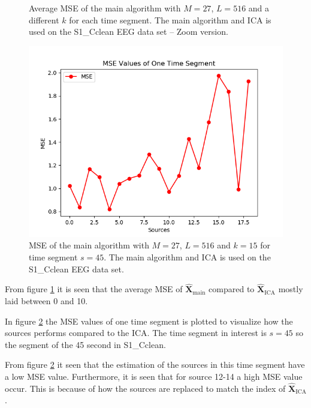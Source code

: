 \begin{figure}[H]
\begin{minipage}[t]{.45\textwidth}
	\caption{Average MSE of the main algorithm with $M=27$, $L = 516$ and a different $k$ for each time segment. The main algorithm and ICA is used on the S1\_Cclean EEG data set -- Zoom version.}
	\label{fig:M=N_1_2}
    \end{minipage}
\end{figure}
\noindent 
 
\begin{figure}[H]
\centering
\includegraphics[scale=0.5]{figures/ch_7/MSE_M=N.png}
\caption{MSE of the main algorithm with $M=27$, $L = 516$ and $k=15$ for time segment $s=45$. The main algorithm and ICA is used on the S1\_Cclean EEG data set.}
\label{fig:M=N_2}
\end{figure}
\noindent
From figure \ref{fig:M=N_1_2} it is seen that the average MSE of $\hat{\mathbf{X}}_{\text{main}}$ compared to $\hat{\mathbf{X}}_{\text{ICA}}$ mostly laid between 0 and 10. 

In figure \ref{fig:M=N_2} the MSE values of one time segment is plotted to visualize how the sources performs compared to the ICA. The time segment in interest is $s = 45$ so the segment of the 45 second in S1\_Cclean. 

From figure \ref{fig:M=N_2} it seen that the estimation of the sources in this time segment have a low MSE value. Furthermore, it is seen that for source 12-14 a high MSE value occur. This is because of how the sources are replaced to match the index of $\hat{\mathbf{X}}_{\text{ICA}}$.

